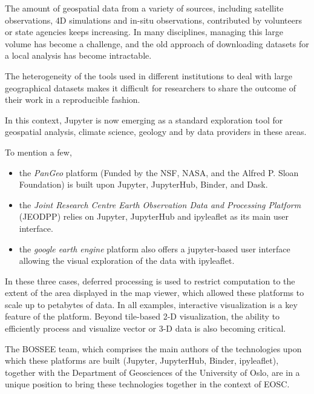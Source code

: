 \begin{task}[
  title=Geosciences application,
  id=geoscience,
  lead=UIO,
  PM=24,
  wphases={0-48},
  partners={UIO,QS,SRL}
]


The amount of geospatial data from a variety of sources, including satellite observations, 4D simulations and in-situ observations, contributed by volunteers
or state agencies keeps increasing. In many disciplines, managing this large volume
has become a challenge, and the old approach of downloading datasets for a local
analysis has become intractable.

The heterogeneity of the tools used in different institutions to deal with
large geographical datasets makes it difficult for researchers to share the outcome
of their work in a reproducible fashion.

In this context, Jupyter is now emerging as a standard exploration tool for
geospatial analysis, climate science, geology and by data providers in these areas.

To mention a few,

\begin{itemize}
\item
   the \emph{PanGeo} platform (Funded by the NSF, NASA, and the Alfred P.
   Sloan Foundation) is built upon Jupyter, JupyterHub, Binder, and Dask.
\item
   the \emph{Joint Research Centre Earth Observation Data and Processing Platform}
   (JEODPP) relies on Jupyter, JupyterHub and ipyleaflet as its main user
   interface.
\item
   the \emph{google earth engine} platform also offers a jupyter-based user
   interface allowing the visual exploration of the data with ipyleaflet.
\end{itemize}

In these three cases, deferred processing is used to restrict computation to
the extent of the area displayed in the map viewer, which allowed these
platforms to scale up to petabytes of data. In all examples, interactive
visualization is a key feature of the platform. Beyond tile-based
2-D visualization, the ability to efficiently process and visualize vector
or 3-D data is also becoming critical.

The BOSSEE team, which comprises the main authors of the technologies upon
which these platforms are built (Jupyter, JupyterHub, Binder, ipyleaflet),
together with the Department of Geosciences of the University of Oslo, are
in a unique position to bring these technologies together in the context of
EOSC.


\end{task}
